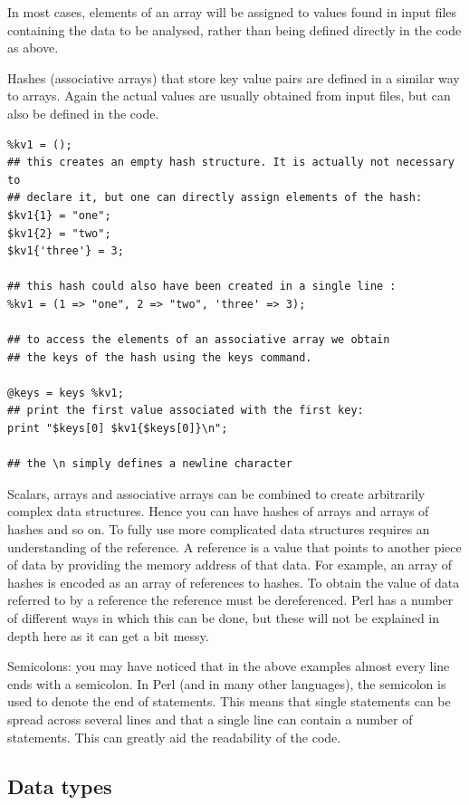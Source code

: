 \documentclass[11pt]{article}
\begin{document}
In most cases, elements of an array will be assigned to values found in
input files containing the data to be analysed, rather than being
defined directly in the code as above.

Hashes (associative arrays) that store key value pairs are defined in a
similar way to arrays. Again the actual values are usually obtained from
input files, but can also be defined in the code.

\begin{verbatim}
%kv1 = ();
## this creates an empty hash structure. It is actually not necessary to
## declare it, but one can directly assign elements of the hash:
$kv1{1} = "one";
$kv1{2} = "two";
$kv1{'three'} = 3;

## this hash could also have been created in a single line :
%kv1 = (1 => "one", 2 => "two", 'three' => 3);

## to access the elements of an associative array we obtain
## the keys of the hash using the keys command.

@keys = keys %kv1;
## print the first value associated with the first key:
print "$keys[0] $kv1{$keys[0]}\n";

## the \n simply defines a newline character
\end{verbatim}


Scalars, arrays and associative arrays can be combined to create
arbitrarily complex data structures. Hence you can have hashes of arrays
and arrays of hashes and so on. To fully use more complicated data
structures requires an understanding of the reference. A reference is a
value that points to another piece of data by providing the memory
address of that data. For example, an array of hashes is encoded as an
array of references to hashes. To obtain the value of data referred to
by a reference the reference must be dereferenced. Perl has
a number of different ways in which this can be done, but these will not
be explained in depth here as it can get a bit messy. 

Semicolons: you may have noticed that in the above examples almost every
line ends with a semicolon. In Perl (and in many other languages), the
semicolon is used to denote the end of statements. This means
that single statements can be spread across several lines and that a
single line can contain a number of statements. This can greatly aid the
readability of the code.

\subsection{Data types}
\label{sec:orgheadline28}
\end{document}
